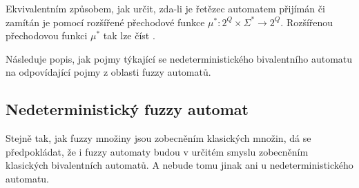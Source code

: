 \documentclass[a4paper,10pt]{article}
\begin{document}
Ekvivalentním způsobem, jak určit, zda-li je řetězec automatem přijímán či zamítán je pomocí rozšířené přechodové funkce $\mu^*: 2^Q \times \Sigma^* \rightarrow 2^Q$. Rozšířenou přechodovou funkci $\mu^*$ tak lze číst .  

Následuje popis, jak pojmy týkající se nedeterministického bivalentního automatu  na odpovídající pojmy z oblasti fuzzy automatů. 

% 

\subsection{Nedeterministický fuzzy automat}
Stejně tak, jak fuzzy množiny jsou zobecněním klasických  množin, dá se předpokládat, že i fuzzy automaty budou v určitém smyslu zobecněním klasických bivalentních automatů. A nebude tomu jinak ani u nedeterministického automatu.
\end{document}
